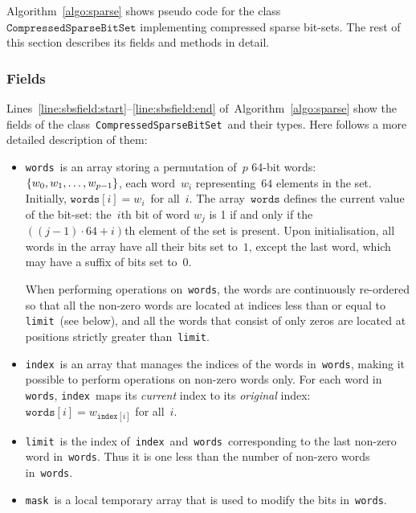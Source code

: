 \documentclass[a4paper,11pt]{article}
\theoremstyle{definition}
\newcommand{\Algoref}[1]{Algorithm~\ref{#1}}
\newcommand{\Linesref}[2]{Lines~\ref{#1}--\ref{#2}}
\newcommand{\Words}{\texttt{words}}
\newcommand{\Index}{\texttt{index}}
\newcommand{\Mask}{\texttt{mask}}
\newcommand{\Limit}{\texttt{limit}}
\newcommand{\SparseBitSet}{\texttt{CompressedSparseBitSet}}
\newcommand{\bitset}[0]{compressed sparse bit-set}
\numberwithin{equation}{section}
\begin{document}
\Algoref{algo:sparse} shows pseudo code for the class~$\SparseBitSet$
implementing {\bitset}s.
The rest of this section describes its fields and methods in detail.

\begin{algorithm}[H]
  \begin{algorithmic}[1]  %
    
    \end{algorithmic}
  \caption{Pseudo code for the class \SparseBitSet.}
  \label{algo:sparse}
\end{algorithm}

\subsubsection{Fields}
\label{sbs:fields}

\Linesref{line:sbsfield:start}{line:sbsfield:end} of~\Algoref{algo:sparse} show the fields
of the class~\SparseBitSet~and their types. Here follows a more detailed description of them:

\begin{itemize}
  \item \Words~is an array storing a permutation of~$p$ 64-bit
    words:~$\left\{w_0, w_1, \dots, w_{p-1}\right\}$, each word~$w_i$
    representing~$64$ elements in the set.
    Initially, $\Words[i] = w_i$~for all~$i$.
    The array~$\Words$ defines the current
    value of the bit-set:
    the~$i$th bit of word $w_j$ is 1 if and only if
    the~$\left((j-1) \cdot 64 + i\right)$th element of
    the set is present.
    Upon initialisation, all words in the array
    have all their bits set to~$1$,
    except the last word, which may have a suffix of bits set to~$0$.

    When performing operations on~\Words, the words are continuously re-ordered
    so that all the non-zero words are
    located at indices less than or equal to \Limit~(see below),
    and all the words that consist of only zeros are located at positions
    strictly greater than~\Limit.

  \item \Index~is an array that manages the indices of the words in~\Words,
    making it possible to perform operations on non-zero words only.
    For each word in \Words, \Index~maps its \emph{current} index to its
    \emph{original} index:~$\Words[i] = w_{\Index[i]}$ for all~$i$.

  \item \Limit~is the index of~\Index~and~\Words~corresponding
    to the last non-zero word in~\Words.
    Thus it is one less than the number of non-zero words in~\Words.

  \item \Mask~is a local temporary array that is used to modify the bits in~\Words.

\end{itemize}
\end{document}
